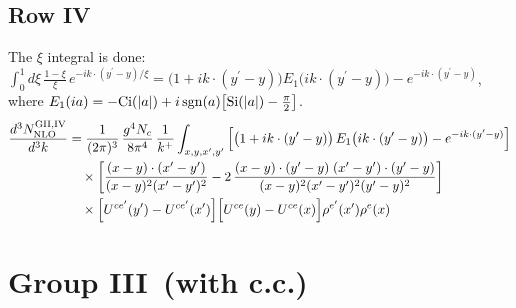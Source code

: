 \documentclass[9pt]{article}
\numberwithin{equation}{section}
\begin{document}
\subsection{Row IV}
The $\xi$ integral is done: $\int_{0}^{1}d\xi\,\frac{1-\xi}{\xi}\,e^{-ik\cdot(y^{\prime}-y)/\xi}=\big(1+ik\cdot(y^{\prime}-y)\big)E_{1}\big(ik\cdot(y^{\prime}-y)\big)-e^{-ik\cdot(y^{\prime}-y)}$, where $E_{1}(ia)=-{\rm Ci}(|a|)+i\,{\rm sgn}(a)\big[{\rm Si}(|a|)-\frac{\pi}{2}\big]$.
\begin{align}
\frac{d^{3}N^{\rm GII,IV}_{\rm NLO}}{d^{3}k}&=\frac{1}{(2\pi)^{3}}\,\frac{g^{4}N_{c}}{8\pi^{4}}\,\frac{1}{k^{+}}\int_{x,y,x^{\prime},y^{\prime}}\Big[\big(1+ik\cdot(y^{\prime}-y)\big)\,E_{1}\big(ik\cdot(y^{\prime}-y)\big)-e^{-ik\cdot(y^{\prime}-y)}\Big]\notag\\&\quad\times\bigg[\frac{(x-y)\cdot(x^{\prime}-y^{\prime})}{(x-y)^{2}(x^{\prime}-y^{\prime})^{2}}-2\,\frac{(x-y)\cdot(y^{\prime}-y)\;(x^{\prime}-y^{\prime})\cdot(y^{\prime}-y)}{(x-y)^{2}(x^{\prime}-y^{\prime})^{2}(y^{\prime}-y)^{2}}\bigg]\notag\\&\quad\times\Big[U^{ce^{\prime}}(y^{\prime})-U^{ce^{\prime}}(x^{\prime})\Big]\Big[U^{ce}(y)-U^{ce}(x)\Big]\rho^{e^{\prime}}(x^{\prime})\rho^{e}(x)
\end{align}
\section{Group III\, (with c.c.)}
\end{document}
